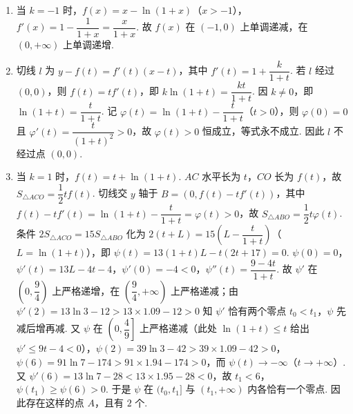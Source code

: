 \begin{solution}
\begin{enumerate}
\item 当 \(k=-1\) 时，\(f(x)=x-\ln(1+x)\)（\(x>-1\)），\(f'(x)=1-\dfrac1{1+x}=\dfrac{x}{1+x}\). 故 \(f(x)\) 在 \((-1,0)\) 上单调递减，在 \((0,+\infty)\) 上单调递增.
\item 切线 \(l\) 为 \(y-f(t)=f'(t)(x-t)\)，其中 \(f'(t)=1+\dfrac{k}{1+t}\). 若 \(l\) 经过 \((0,0)\)，则 \(f(t)=tf'(t)\)，即 \(k\ln(1+t)=\dfrac{kt}{1+t}\). 因 \(k\ne0\)，即 \(\ln(1+t)=\dfrac{t}{1+t}\). 记 \(\varphi(t)=\ln(1+t)-\dfrac{t}{1+t}\)（\(t>0\)），则 \(\varphi(0)=0\) 且 \(\varphi'(t)=\dfrac{t}{(1+t)^2}>0\)，故 \(\varphi(t)>0\) 恒成立，等式永不成立. 因此 \(l\) 不经过点 \((0,0)\).
\item 当 \(k=1\) 时，\(f(t)=t+\ln(1+t)\). \(AC\) 水平长为 \(t\)，\(CO\) 长为 \(f(t)\)，故 \(S_{\triangle ACO}=\dfrac12tf(t)\). 切线交 \(y\) 轴于 \(B=(0,f(t)-tf'(t))\)，其中 \(f(t)-tf'(t)=\ln(1+t)-\dfrac{t}{1+t}=\varphi(t)>0\)，故 \(S_{\triangle ABO}=\dfrac12t\varphi(t)\). 条件 \(2S_{\triangle ACO}=15S_{\triangle ABO}\) 化为 \(2(t+L)=15\left(L-\dfrac{t}{1+t}\right)\)（\(L=\ln(1+t)\)），即 \(\psi(t)=13(1+t)L-t(2t+17)=0\). \(\psi(0)=0\)，\(\psi'(t)=13L-4t-4\)，\(\psi'(0)=-4<0\)，\(\psi''(t)=\dfrac{9-4t}{1+t}\). 故 \(\psi'\) 在 \(\left(0,\dfrac94\right)\) 上严格递增，在 \(\left(\dfrac94,+\infty\right)\) 上严格递减；由 \(\psi'(2)=13\ln3-12>13\times1.09-12>0\) 知 \(\psi'\) 恰有两个零点 \(t_0<t_1\)，\(\psi\) 先减后增再减. 又 \(\psi\) 在 \(\left(0,\dfrac49\right]\) 上严格递减（此处 \(\ln(1+t)\leqslant t\) 给出 \(\psi'\leqslant9t-4<0\)），\(\psi(2)=39\ln3-42>39\times1.09-42>0\)，\(\psi(6)=91\ln7-174>91\times1.94-174>0\)，而 \(\psi(t)\to-\infty\)（\(t\to+\infty\)）. 又 \(\psi'(6)=13\ln7-28<13\times1.95-28<0\)，故 \(t_1<6\)，\(\psi(t_1)\geqslant\psi(6)>0\). 于是 \(\psi\) 在 \((t_0,t_1]\) 与 \((t_1,+\infty)\) 内各恰有一个零点. 因此存在这样的点 \(A\)，且有 \(2\) 个.
\end{enumerate}
\end{solution}

